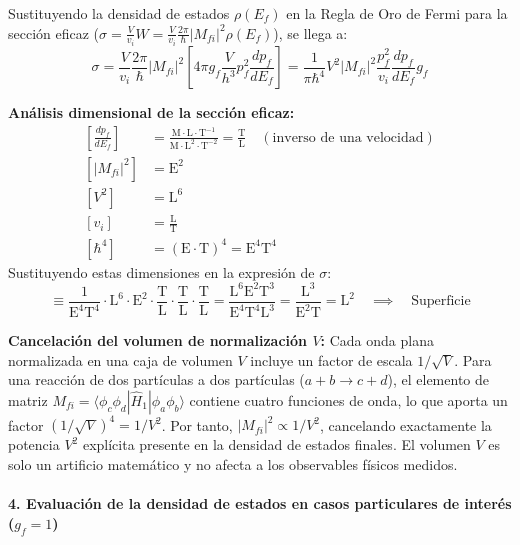 Sustituyendo la densidad de estados $\rho(E_f)$ en la Regla de Oro de Fermi para la sección eficaz ($\sigma = \frac{V}{v_i} W = \frac{V}{v_i} \frac{2\pi}{\hbar} |M_{fi}|^2 \rho(E_f)$), se llega a:
\begin{equation}
\sigma = \frac{V}{v_i} \frac{2\pi}{\hbar} |M_{fi}|^2 \left[ 4\pi g_f \frac{V}{h^3} p_f^2 \frac{dp_f}{dE_f} \right] = \frac{1}{\pi\hbar^4} V^2 |M_{fi}|^2 \frac{p_f^2}{v_i} \frac{dp_f}{dE_f} g_f
\end{equation}

\textbf{Análisis dimensional de la sección eficaz:}
\begin{align}
\left[\frac{dp_f}{dE_f}\right] &= \frac{\text{M} \cdot \text{L} \cdot \text{T}^{-1}}{\text{M} \cdot \text{L}^2 \cdot \text{T}^{-2}} = \frac{\text{T}}{\text{L}} \quad (\text{inverso de una velocidad}) \\
[|M_{fi}|^2] &= \text{E}^2 \\
[V^2] &= \text{L}^6 \\
[v_i] &= \frac{\text{L}}{\text{T}} \\
[\hbar^4] &= (\text{E} \cdot \text{T})^4 = \text{E}^4 \text{T}^4
\end{align}
Sustituyendo estas dimensiones en la expresión de $\sigma$:
\begin{equation}
[\sigma] \equiv \frac{1}{\text{E}^4 \text{T}^4} \cdot \text{L}^6 \cdot \text{E}^2 \cdot \frac{\text{T}}{\text{L}} \cdot \frac{\text{T}}{\text{L}} \cdot \frac{\text{T}}{\text{L}} = \frac{\text{L}^6 \text{E}^2 \text{T}^3}{\text{E}^4 \text{T}^4 \text{L}^3} = \frac{\text{L}^3}{\text{E}^2 \text{T}} = \text{L}^2 \quad \implies \quad \text{Superficie}
\end{equation}

\textbf{Cancelación del volumen de normalización $V$:}
Cada onda plana normalizada en una caja de volumen $V$ incluye un factor de escala $1/\sqrt{V}$. Para una reacción de dos partículas a dos partículas ($a + b \to c + d$), el elemento de matriz $M_{fi} = \langle \phi_c \phi_d | \hat{H}_1 | \phi_a \phi_b \rangle$ contiene cuatro funciones de onda, lo que aporta un factor $(1/\sqrt{V})^4 = 1/V^2$.
Por tanto, $|M_{fi}|^2 \propto 1/V^2$, cancelando exactamente la potencia $V^2$ explícita presente en la densidad de estados finales. El volumen $V$ es solo un artificio matemático y no afecta a los observables físicos medidos.

\paragraph{4. Evaluación de la densidad de estados en casos particulares de interés ($g_f = 1$)}

